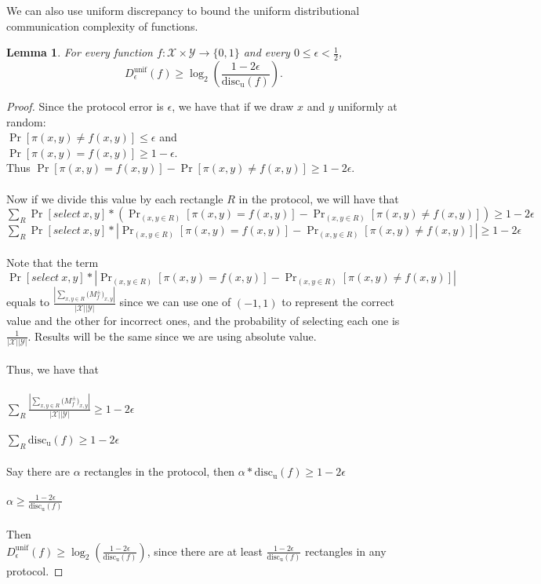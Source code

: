\documentclass[11pt,oneside]{book}
\theoremstyle{plain}
\newtheorem{lemma}{Lemma}
\theoremstyle{definition}
\theoremstyle{plain}
\newcommand{\calX}{\mathcal{X}}
\newcommand{\calY}{\mathcal{Y}}
\newcommand{\discu}{\mathrm{disc_u}}
\begin{document}
We can also use uniform discrepancy to bound the uniform distributional  communication complexity of functions.

\begin{lemma}
	For every function $f : \calX \times \calY \to \{0,1\}$ and every $0 \le \epsilon < \frac12$, 
	\[
	D_\epsilon^{\mathrm{unif}}(f) \ge \log_2 \left( \frac{1-2\epsilon}{\discu(f)} \right).
	\]
\end{lemma}

\begin{proof}
	Since the protocol error is $\epsilon$, we have that if we draw  $x$ and $y$ uniformly at random: \\
	$\Pr[ \pi(x,y) \neq f(x,y)] \le \epsilon$ and\\
	$\Pr[ \pi(x,y) = f(x,y)] \ge 1-\epsilon$. \\
	Thus $\Pr[ \pi(x,y) = f(x,y)] - \Pr[ \pi(x,y) \neq f(x,y)] \ge 1-2\epsilon$. \\
	\\
	Now if we divide this value by each rectangle $R$ in the protocol, we will have that \\
	$\sum_{R} \Pr[select\ x,y] * (\Pr_{(x,y \in R)}[ \pi(x,y) = f(x,y)] - \Pr_{(x,y \in R)}[ \pi(x,y) \neq f(x,y)]) \ge 1-2\epsilon$ \\
	$\sum_{R} \Pr[select\ x,y] * |\Pr_{(x,y \in R)}[ \pi(x,y) = f(x,y)] - \Pr_{(x,y \in R)}[ \pi(x,y) \neq f(x,y)]| \ge 1-2\epsilon$ \\
	\\
	Note that the term  $\Pr[select\ x,y] * |\Pr_{(x,y \in R)}[ \pi(x,y) = f(x,y)] - \Pr_{(x,y \in R)}[ \pi(x,y) \neq f(x,y)]|$ equals to $\frac{\left| \sum_{x,y \in R} \big(M^{\pm}_f\big)_{x,y} \right|}{|\calX||\calY|}$ since we can use one of $(-1,1)$ to represent the correct value and the other for incorrect ones, and the probability of selecting each one is $\frac{1}{|\calX||\calY|}$. Results will be the same since we are using absolute value. \\
	\\
	Thus, we have that \\
	\\
	$\sum_{R} \frac{\left| \sum_{x,y \in R} \big(M^{\pm}_f\big)_{x,y} \right|}{|\calX||\calY|} \ge 1-2\epsilon$\\
	\\
	$\sum_{R} \discu(f) \ge 1-2\epsilon$\\
	\\
	Say there are $\alpha$ rectangles in the protocol, then
	$\alpha * \discu(f) \ge 1-2\epsilon$ \\ 
	\\
	$\alpha \ge \frac{1-2\epsilon}{\discu(f)}$ \\
	\\
	Then\\
	$D_\epsilon^{\mathrm{unif}}(f) \ge \log_2 \left( \frac{1-2\epsilon}{\discu(f)} \right)$, since there are at least $\frac{1-2\epsilon}{\discu(f)}$ rectangles in any protocol.
\end{proof}
\end{document}
